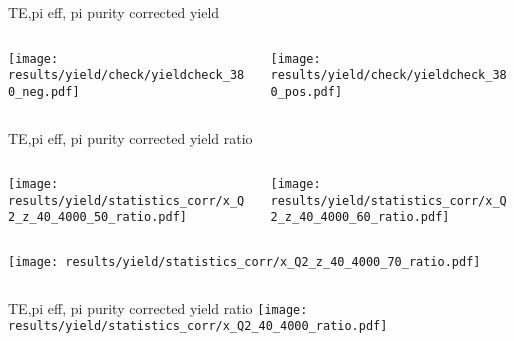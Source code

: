 \begin{frame}{TE,pi eff, pi purity corrected yield}
\begin{columns}
\begin{column}[T]{0.5\textwidth}
\texttt{[image: results/yield/check/yieldcheck\_380\_neg.pdf]}
\end{column}
\begin{column}[T]{0.5\textwidth}
\texttt{[image: results/yield/check/yieldcheck\_380\_pos.pdf]}
\end{column}
\end{columns}
\end{frame}
\begin{frame}{TE,pi eff, pi purity corrected yield ratio}
\begin{columns}
\begin{column}[T]{0.5\textwidth}
\texttt{[image: results/yield/statistics\_corr/x\_Q2\_z\_40\_4000\_50\_ratio.pdf]}
\end{column}
\begin{column}[T]{0.5\textwidth}
\texttt{[image: results/yield/statistics\_corr/x\_Q2\_z\_40\_4000\_60\_ratio.pdf]}
\end{column}
\end{columns}
\begin{columns}
\begin{column}[T]{0.5\textwidth}
\texttt{[image: results/yield/statistics\_corr/x\_Q2\_z\_40\_4000\_70\_ratio.pdf]}
\end{column}
\begin{column}[T]{0.5\textwidth}
\end{column}
\end{columns}
\end{frame}
\begin{frame}{TE,pi eff, pi purity corrected yield ratio}
\texttt{[image: results/yield/statistics\_corr/x\_Q2\_40\_4000\_ratio.pdf]}
\end{frame}
